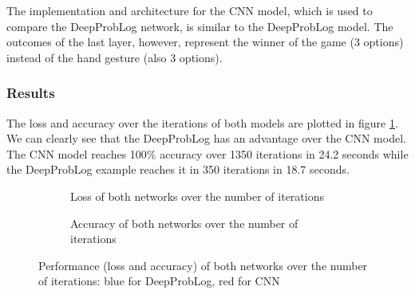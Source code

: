     The implementation and architecture for the CNN model, which is used to compare the DeepProbLog network, is similar to the DeepProbLog model. The outcomes of the last layer, however, represent the winner of the game (3 options) instead of the hand gesture (also 3 options).


\subsubsection{Results}
The loss and accuracy over the iterations of both models are plotted in figure \ref{fig:rps_output}. We can clearly see that the DeepProbLog has an advantage over the CNN model. The CNN model reaches 100\% accuracy over 1350 iterations in 24.2 seconds while the DeepProbLog example reaches it in 350 iterations in 18.7 seconds. 


\begin{figure}[h]
    \centering
    \begin{subfigure}[b]{0.45\textwidth}
        \caption{Loss of both networks over the number of iterations}
    \end{subfigure}
    \hfill
    \begin{subfigure}[b]{0.45\textwidth}
        \caption{Accuracy of both networks over the number of iterations}
    \end{subfigure}
    \caption{Performance (loss and accuracy) of both networks over the number of iterations: blue for DeepProbLog, red for CNN}
    \label{fig:rps_output}
\end{figure}  
